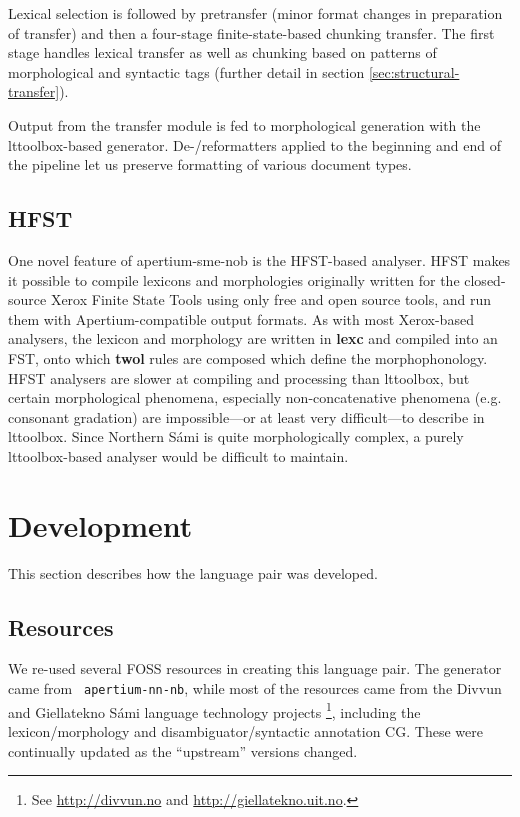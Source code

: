 Lexical selection is followed by pretransfer (minor format changes in
preparation of transfer) and then a four-stage finite-state-based
chunking transfer. The first stage handles lexical transfer as well as
chunking based on patterns of morphological and syntactic tags
(further detail in section \ref{sec:structural-transfer}).

Output from the transfer module is fed to morphological generation
with the lttoolbox-based \nob{} generator. De-/reformatters applied to
the beginning and end of the pipeline let us preserve formatting of
various document types.

\subsection{HFST}
\label{sec:hfst}
One novel feature of apertium-sme-nob is the HFST-based analyser. HFST
makes it possible to compile lexicons and morphologies originally
written for the closed-source Xerox Finite State Tools using only free
and open source tools, and run them with Apertium-compatible output
formats. As with most Xerox-based analysers, the \sme{} lexicon and
morphology are written in \textbf{lexc} and compiled into an FST, onto
which \textbf{twol} rules are composed which define the
morphophonology. HFST analysers are slower at compiling and processing
than lttoolbox, but certain morphological phenomena, especially
non-concatenative phenomena (e.g. \sme{} consonant gradation) are
impossible---or at least very difficult---to describe in lttoolbox.
Since Northern S\'{a}mi is quite morphologically complex, a purely
lttoolbox-based analyser would be difficult to maintain.


\section{Development}
  \label{sec:development}

This section describes how the language pair was developed.
\subsection{Resources}
We re-used several FOSS resources in creating this language pair. The
\nob{} generator came from {\tt
  apertium-nn-nb}\citep{unhammer2009rfr}, while most of the \sme{}
resources came from the Divvun and Giellatekno S\'{a}mi language
technology projects \footnote{See
  \href{http://divvun.no}{http://divvun.no} and
  \href{http://giellatekno.uit.no}{http://giellatekno.uit.no}.},
including the lexicon/morphology and disambiguator/syntactic
annotation CG. These were continually updated as the ``upstream''
versions changed.


